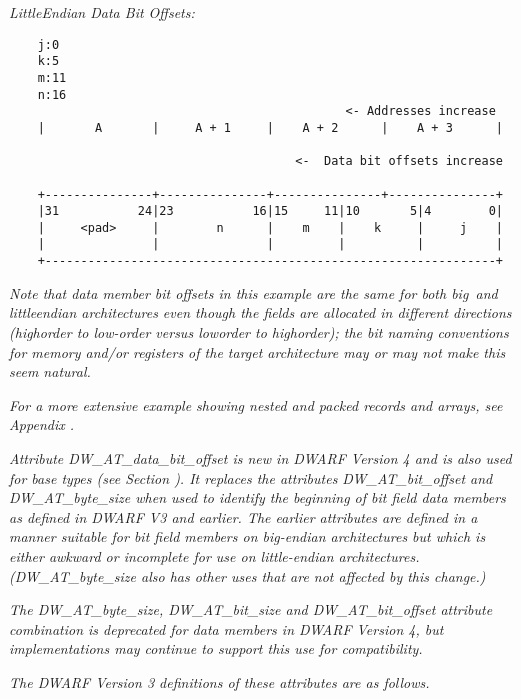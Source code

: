 \textit{Little\dash  Endian Data Bit Offsets:}
\begin{verbatim}
    j:0
    k:5
    m:11
    n:16
                                               <- Addresses increase
    |       A       |     A + 1     |    A + 2      |    A + 3      | 

                                        <-  Data bit offsets increase 

    +---------------+---------------+---------------+---------------+
    |31           24|23           16|15     11|10       5|4        0|
    |     <pad>     |        n      |    m    |    k     |     j    |
    |               |               |         |          |          |
    +---------------------------------------------------------------+

\end{verbatim}

\textit{Note that data member bit offsets in this example are the
same for both big\dash\ and little\dash endian architectures even
though the fields are allocated in different directions
(high\dash order to low-order versus low\dash order to high\dash order);
the bit naming conventions for memory and/or registers of
the target architecture may or may not make this seem natural.}

\textit{For a more extensive example showing nested and packed records
and arrays, see 
Appendix .}

\textit{Attribute DW\_AT\_data\_bit\_offset is new in DWARF Version 4 and
is also used for base types 
(see Section ). 
It replaces the
attributes DW\-\_AT\-\_bit\-\_offset and DW\-\_AT\-\_byte\-\_size when used to
identify the beginning of bit field data members as defined
in DWARF V3 and earlier. The earlier attributes are defined
in a manner suitable for bit field members on big-endian
architectures but which is either awkward or incomplete for
use on little-endian architectures.  (DW\-\_AT\-\_byte\-\_size also
has other uses that are not affected by this change.)}

\textit{The DW\-\_AT\-\_byte\-\_size, DW\-\_AT\-\_bit\-\_size and 
DW\-\_AT\-\_bit\-\_offset
attribute combination is deprecated for data members in DWARF
Version 4, but implementations may continue to support this
use for compatibility.}

\textit{The DWARF Version 3 definitions of these attributes are
as follows.}

